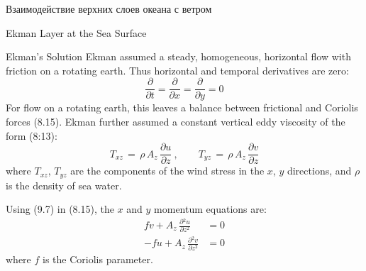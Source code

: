 \begin{chapter}{Взаимодействие верхних слоев океана с ветром}
\begin{section}{Ekman Layer at the Sea Surface}
\begin{paragraph}{Ekman's Solution}
Ekman assumed a steady,
homogeneous, horizontal flow with friction on a rotating earth. Thus
horizontal and temporal derivatives are zero:
\begin{equation}
 \frac{\partial}{\partial{t}}=\frac{\partial}{\partial{x}}=\frac{\partial}{\partial{y}}=0
\end{equation}
For flow on a rotating earth, this leaves a balance between frictional
and Coriolis forces (8.15).  Ekman further assumed a constant vertical
eddy viscosity of the form (8:13):
\begin{equation}
 T_{xz} \,=\,\rho\, A_z \,\frac{\partial{u}}{\partial{z}}\: , \qquad 
 T_{yz} \,=\,\rho\, A_z \,\frac{\partial{v}}{\partial{z}}
\end{equation}
where $T_{xz}$, $T_{yz}$ are the components of the wind
stress in the $x$, $y$ directions, and
$\rho$ is the density of sea water.
%

Using (9.7) in (8.15), the $x$ and $y$ momentum equations are:
\begin{subequations}
\begin{align}
fv +  A_z \, \frac{\partial{^2 u}}{\partial{z^2}} &= 0  \\
-fu + A_z \, \frac{\partial{^2 v}}{\partial{z^2}} &= 0
\end{align}
\end{subequations}
where $f$ is the Coriolis parameter.
%


\end{paragraph}
\end{section}
\end{chapter}
